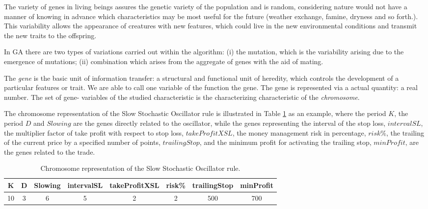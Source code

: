 The variety of genes in living beings assures the genetic variety of the population and is random, considering nature would not have a manner of knowing in advance which characteristics may be most useful for the future (weather exchange, famine, dryness and so forth.). This variability allows the appearance of creatures with new features, which could live in the new environmental conditions and transmit the new traits to the offspring.

In GA there are two types of variations carried out within the algorithm: (i) the mutation, which is the variability arising due to the emergence of mutations; (ii) combination which arises from the aggregate of genes with the aid of mating.

The \textit{gene} is the basic unit of information transfer: a structural and functional unit of heredity, which controls the development of a particular features or trait. We are able to call one variable of the function the gene. The gene is represented via a actual quantity: a real number. The set of gene- variables of the studied characteristic is the characterizing characteristic of the \textit{chromosome}.

The chromosome representation of the  Slow Stochastic Oscillator rule is illustrated in Table \ref{tab:Chromosome} as an example, where the period $K$, the period $D$ and $Slowing$ are the genes directly related to the oscillator, while the genes representing the interval of the stop loss, $intervalSL$, the multiplier factor of take profit with respect to stop loss, $takeProfitXSL$, the money management risk in percentage, $risk\%$, the trailing of the current price by a specified number of points, $trailingStop$, and the minimum profit for activating the trailing stop, $minProfit$, are the genes related to the trade.

\begin{center}
\begin{table}[htb]
\centering
\begin{tabular}{|c|c|c|c|c|c|c|c|}
\hline 
K & D & Slowing & intervalSL & takeProfitXSL & risk\% & trailingStop & minProfit\\ 
\hline 
10 & 3 & 6 & 5 & 2 & 2 & 500 & 700\\ 
\hline 
\end{tabular} 
\caption{\label{tab:Chromosome}Chromosome representation of the  Slow Stochastic Oscillator rule.}
\end{table}
\end{center}

